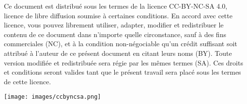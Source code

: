  \vspace{12cm}



Ce document est distribu\'{e} sous les termes de la licence CC-BY-NC-SA 4.0, licence de libre diffusion soumise à certaines conditions. En accord avec cette licence, vous pouvez librement utiliser, adapter, modifier et redistribuer le contenu de ce document dans n'importe quelle circonstance, sauf à des fins commerciales (NC), et à la condition non-n\'{e}gociable qu’un cr\'{e}dit suffisant soit attribu\'{e} à l'auteur de ce pr\'{e}sent document en citant leurs noms (BY). Toute version modifi\'{e}e et redistribu\'{e}e sera r\'{e}gie par les m\^{e}mes termes (SA). Ces droits et conditions seront valides tant que le pr\'{e}sent travail sera plac\'{e} sous les termes de cette licence.

\begin{center}
\texttt{[image: images/ccbyncsa.png]}
\end{center}


\newpage
